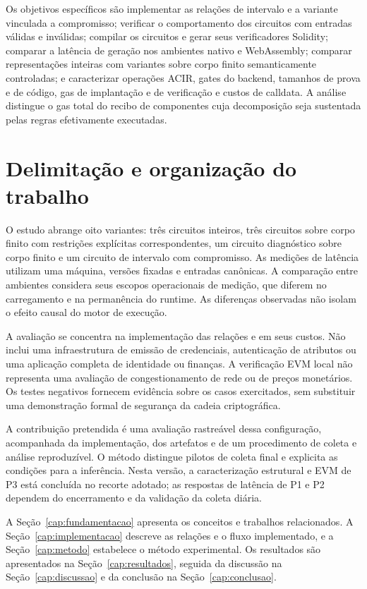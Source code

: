Os objetivos específicos são implementar as relações de intervalo e a variante vinculada a compromisso; verificar o comportamento dos circuitos com entradas válidas e inválidas; compilar os circuitos e gerar seus verificadores Solidity; comparar a latência de geração nos ambientes nativo e WebAssembly; comparar representações inteiras com variantes sobre corpo finito semanticamente controladas; e caracterizar operações ACIR, gates do backend, tamanhos de prova e de código, gas de implantação e de verificação e custos de calldata. A análise distingue o gas total do recibo de componentes cuja decomposição seja sustentada pelas regras efetivamente executadas.

\section{Delimitação e organização do trabalho}

O estudo abrange oito variantes: três circuitos inteiros, três circuitos sobre corpo finito com restrições explícitas correspondentes, um circuito diagnóstico sobre corpo finito e um circuito de intervalo com compromisso. As medições de latência utilizam uma máquina, versões fixadas e entradas canônicas. A comparação entre ambientes considera seus escopos operacionais de medição, que diferem no carregamento e na permanência do runtime. As diferenças observadas não isolam o efeito causal do motor de execução.

A avaliação se concentra na implementação das relações e em seus custos. Não inclui uma infraestrutura de emissão de credenciais, autenticação de atributos ou uma aplicação completa de identidade ou finanças. A verificação EVM local não representa uma avaliação de congestionamento de rede ou de preços monetários. Os testes negativos fornecem evidência sobre os casos exercitados, sem substituir uma demonstração formal de segurança da cadeia criptográfica.

A contribuição pretendida é uma avaliação rastreável dessa configuração, acompanhada da implementação, dos artefatos e de um procedimento de coleta e análise reproduzível. O método distingue pilotos de coleta final e explicita as condições para a inferência. Nesta versão, a caracterização estrutural e EVM de P3 está concluída no recorte adotado; as respostas de latência de P1 e P2 dependem do encerramento e da validação da coleta diária.

A Seção~\ref{cap:fundamentacao} apresenta os conceitos e trabalhos relacionados. A Seção~\ref{cap:implementacao} descreve as relações e o fluxo implementado, e a Seção~\ref{cap:metodo} estabelece o método experimental. Os resultados são apresentados na Seção~\ref{cap:resultados}, seguida da discussão na Seção~\ref{cap:discussao} e da conclusão na Seção~\ref{cap:conclusao}.
